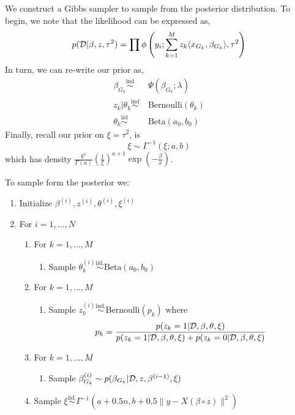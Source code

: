 \documentclass[12pt]{article}
\begin{document}
We construct a Gibbs sampler to sample from the posterior distribution. To begin, we note that the likelihood can be expressed as,
\begin{equation}
    p(\mathcal{D} | \beta, z, \tau^2) = \prod \phi \left(y_i; \sum_{k = 1}^M z_k \langle x_{G_k}, \beta_{G_k} \rangle, \tau^2 \right)
\end{equation}
In turn, we can re-write our prior as,
\begin{equation}
\begin{aligned}
    \beta_{G_k} \overset{\text{ind}}{\sim} &\ \Psi(\beta_{G_k}; \lambda) \\
z_k | \theta_k \overset{\text{ind}}{\sim} &\ \text{Bernoulli}(\theta_k) \\
    \theta_k \overset{\text{iid}}{\sim} &\ \text{Beta}(a_0, b_0)
\end{aligned}
\end{equation}
Finally, recall our prior on $\xi = \tau^2$, is
\begin{equation}
    \xi \sim \Gamma^{-1}(\xi; a, b)
\end{equation}
which has density $ \frac{b^a}{\Gamma(a)} \left( \frac{1}{\xi} \right)^{a + 1} \exp\left( -\frac{\beta}{x} \right)$.

To sample form the posterior we:
\begin{enumerate}
    \itemsep0em
    \item Initialize $\beta^{(i)}, z^{(i)}, \theta^{(i)}, \xi^{(i)}$
    \item For $i = 1, \dots, N$
    \begin{enumerate}
	\item For $k = 1, \dots, M$
	\begin{enumerate}
	    \item Sample $\theta^{(i)}_{k} \overset{\text{iid.}}{\sim} \text{Beta}(a_0, b_0)$
	\end{enumerate}
	\item For $k = 1, \dots, M$
	\begin{enumerate}
	    \item Sample $z^{(i)}_{k} \overset{\text{ind.}}{\sim} \text{Bernoulli}(p_k)$
	    where
	    \begin{equation}
		p_k = \frac
		{p(z_k = 1 | \mathcal{D}, \beta, \theta, \xi)}
		{p(z_k = 1 | \mathcal{D}, \beta, \theta, \xi) + p(z_k = 0 | \mathcal{D}, \beta, \theta, \xi)}
	    \end{equation}
	\end{enumerate}
	\item For $k = 1, \dots, M$
	\begin{enumerate}
	    \item Sample $ \beta_{G_k}^{(i)} \sim p(\beta_{G_k} | \mathcal{D}, z, \beta^{(i-1)}, \xi)$
	\end{enumerate}
    \item Sample $\xi \overset{\text{iid.}}{\sim} \Gamma^{-1}(a + 0.5n, b + 0.5 \| y - X (\beta \circ z) \| ^2 )$
    \end{enumerate}
\end{enumerate}
\end{document}
